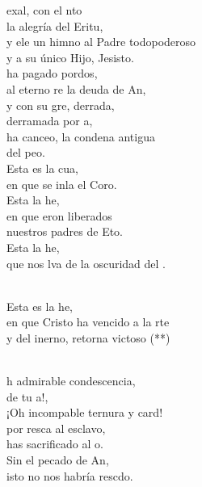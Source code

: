 \begin{cancion}
	exal, con el nto \\
	la alegría del Eritu, \\
	y ele un himno al Padre todopoderoso\\
	y a su único Hijo, Jesisto.\\
	 ha pagado pordos,\\
	al eterno re la deuda de An,\\
	y con su gre, derrada,\\
	derramada por a,\\
	ha canceo, la condena antigua\\
	del peo.\\
	Esta es la cua,\\
	en que se inla el Coro.\\
	Esta  la he,\\
	en que eron liberados\\
	nuestros padres de Eto.\\
	Esta  la he,\\
	que nos lva de la oscuridad del .\\\jump\\
	\begin{chorus}%
	Esta es la he,\\
	en que Cristo ha vencido a la rte\\
	y del inerno, retorna victoso (**)\\
	\end{chorus}%
	\jump\\
	h admirable condescencia,\\
	de tu a!,\\
	¡Oh incompable ternura y card!\\
	por resca al esclavo,\\
	has sacrificado al o.\\
	Sin el pecado de An,\\
	isto no nos habría rescdo.\\\jump\\

\end{cancion}
